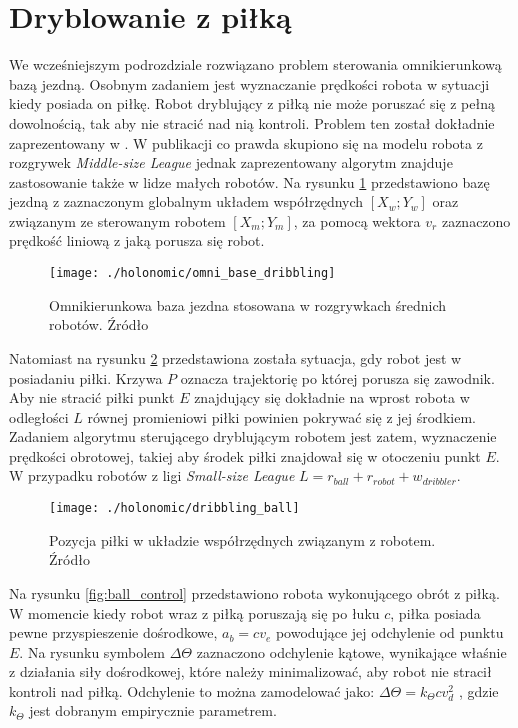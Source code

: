 \section{Dryblowanie z piłką}
We wcześniejszym podrozdziale rozwiązano problem sterowania omnikierunkową bazą jezdną. Osobnym zadaniem jest wyznaczanie prędkości robota w sytuacji kiedy posiada on piłkę.
Robot dryblujący z piłką nie może poruszać się z pełną dowolnością, tak aby nie stracić nad nią kontroli. Problem ten został dokładnie zaprezentowany w \cite{dribbling}. W publikacji co prawda skupiono
się na modelu robota z rozgrywek \emph{Middle-size League} jednak zaprezentowany algorytm znajduje zastosowanie także w lidze małych robotów.
Na rysunku \ref{fig:omni_base_dribbling} przedstawiono bazę jezdną z zaznaczonym globalnym układem współrzędnych $[X_w;Y_w]$ oraz związanym ze sterowanym robotem $[X_m;Y_m]$, za pomocą wektora $v_r$ zaznaczono
prędkość liniową z jaką porusza się robot.
\begin{figure}[h]
\centering
\texttt{[image: ./holonomic/omni\_base\_dribbling]}
\caption{Omnikierunkowa baza jezdna stosowana w rozgrywkach średnich robotów. Źródło \cite{dribbling}}\label{fig:omni_base_dribbling}
\end{figure}
Natomiast na rysunku \ref{fig:dribbling_ball} przedstawiona została sytuacja, gdy robot jest w posiadaniu piłki. Krzywa $P$ oznacza trajektorię po której porusza się zawodnik. Aby nie stracić piłki
punkt $E$ znajdujący się dokładnie na wprost robota w odległości $L$ równej promieniowi piłki powinien pokrywać się z jej środkiem. Zadaniem algorytmu sterującego dryblującym robotem jest zatem, wyznaczenie
prędkości obrotowej, takiej aby środek piłki znajdował się w otoczeniu punkt $E$. W przypadku robotów z ligi \emph{Small-size League} $L=r_{ball}+r_{robot} +w_{dribbler}$.
\begin{figure}[h]
\centering
\texttt{[image: ./holonomic/dribbling\_ball]}
\caption{ Pozycja piłki w układzie współrzędnych związanym z robotem. Źródło \cite{dribbling} }\label{fig:dribbling_ball}
\end{figure}
Na rysunku \ref{fig:ball_control} przedstawiono robota wykonującego obrót z piłką. W momencie kiedy robot wraz z piłką poruszają się po łuku $c$, piłka posiada pewne przyspieszenie dośrodkowe,
$a_b=cv_e$ powodujące jej odchylenie od punktu $E$. Na rysunku symbolem $\Delta\Theta$ zaznaczono odchylenie kątowe, wynikające właśnie z działania siły dośrodkowej, które należy minimalizować,
 aby robot nie stracił kontroli nad piłką. Odchylenie to można zamodelować jako: $\Delta\Theta=k_{\Theta}cv_{d}^2$ , gdzie $k_{\Theta}$ jest dobranym empirycznie parametrem.
